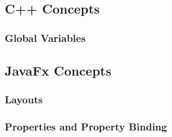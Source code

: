\subsection{C++ Concepts}

\subsubsection{Global Variables} 

\subsection{JavaFx Concepts}

\subsubsection{Layouts}
\subsubsection{Properties and Property Binding}